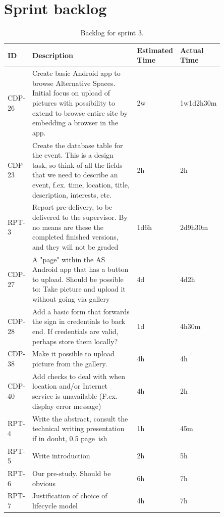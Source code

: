 \section{Sprint backlog}
\label{sec:S4Backlog}

\begin{landscape}
\setlength{\tabcolsep}{12pt}
\begin{table}[htbp]
\centering
{}
\begin{tabular}{|p{0.05\linewidth}|p{0.6\linewidth}|p{0.1\linewidth}|p{0.1\linewidth}|}
\hline
\cellcolor{gray!25} ID & \cellcolor{gray!25} Description & \cellcolor{gray!25} Estimated Time & \cellcolor{gray!25} Actual Time \\
\hline
CDP-26 & Create basic Android app to browse Alternative Spaces. Initial focus on upload of pictures with possibility to extend to browse entire site by embedding a browser in the app. & 2w & 1w1d2h30m \\
CDP-23 & Create the database table for the event. This is a design task, so think of all the fields that we need to describe an event, f.ex. time, location, title, description, interests, etc. & 2h & 2h \\ 
RPT-3  & Report pre-delivery, to be delivered to the supervisor. By no means are these the completed finished versions, and they will not be graded  & 1d6h & 2d9h30m \\
CDP-27 & A "page" within the AS Android app that has a button to upload. Should be possible to: Take picture and upload it without going via gallery & 4d & 4d2h \\
CDP-28 & Add a basic form that forwards the sign in credentials to back end. If credentials are valid, perhaps store them locally? & 1d & 4h30m \\
CDP-38 & Make it possible to upload picture from the gallery. & 4h & 4h \\
CDP-40 & Add checks to deal with when location and/or Internet service is unavailable (F.ex. display error message) & 4h & 2h \\
RPT-4 & Write the abstract, consult the technical writing presentation if in doubt, 0.5 page~ish & 1h & 45m \\
RPT-5 & Write introduction & 2h & 5h \\
RPT-6 & Our pre-study. Should be obvious & 6h & 7h \\
RPT-7 & Justification of choice of lifecycle model & 4h & 7h \\
\hline
\end{tabular}
\caption{Backlog for sprint 3.}
\label{tab:S4Backlog}
\end{table}
\end{landscape}

